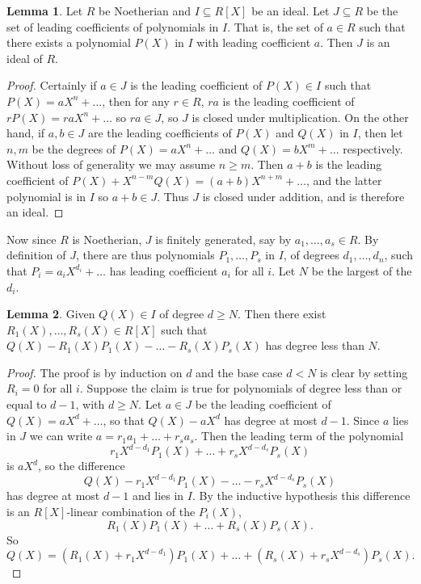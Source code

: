 \documentclass{article}
\newcommand{\rb}[1]{\left( #1 \right)}
\renewcommand{\sb}[1]{\left[ #1 \right]}
\theoremstyle{definition}\newtheorem{definition}{Definition}[subsection]
\theoremstyle{definition}\newtheorem{remark}[definition]{Remark}
\theoremstyle{definition}\newtheorem*{example}{Example}
\theoremstyle{definition}\newtheorem*{note}{Note}
\newtheorem{lemma}[definition]{Lemma}
\begin{document}
\begin{lemma}
Let $ R $ be Noetherian and $ I \subseteq R\sb{X} $ be an ideal. Let $ J \subseteq R $ be the set of leading coefficients of polynomials in $ I $. That is, the set of $ a \in R $ such that there exists a polynomial $ P\rb{X} $ in $ I $ with leading coefficient $ a $. Then $ J $ is an ideal of $ R $.
\end{lemma}

\begin{proof}
Certainly if $ a \in J $ is the leading coefficient of $ P\rb{X} \in I $ such that $ P\rb{X} = aX^n + \dots $, then for any $ r \in R $, $ ra $ is the leading coefficient of $ rP\rb{X} = raX^n + \dots $ so $ ra \in J $, so $ J $ is closed under multiplication. On the other hand, if $ a, b \in J $ are the leading coefficients of $ P\rb{X} $ and $ Q\rb{X} $ in $ I $, then let $ n, m $ be the degrees of $ P\rb{X} = aX^n + \dots $ and $ Q\rb{X} = bX^m + \dots $ respectively. Without loss of generality we may assume $ n \ge m $. Then $ a + b $ is the leading coefficient of $ P\rb{X} + X^{n - m}Q\rb{X} = \rb{a + b}X^{n + m} + \dots $, and the latter polynomial is in $ I $ so $ a + b \in J $. Thus $ J $ is closed under addition, and is therefore an ideal.
\end{proof}

Now since $ R $ is Noetherian, $ J $ is finitely generated, say by $ a_1, \dots, a_s \in R $. By definition of $ J $, there are thus polynomials $ P_1, \dots, P_s $ in $ I $, of degrees $ d_1, \dots, d_n $, such that $ P_i = a_iX^{d_i} + \dots $ has leading coefficient $ a_i $ for all $ i $. Let $ N $ be the largest of the $ d_i $.

\begin{lemma}
Given $ Q\rb{X} \in I $ of degree $ d \ge N $. Then there exist $ R_1\rb{X}, \dots, R_s\rb{X} \in R\sb{X} $ such that $ Q\rb{X} - R_1\rb{X}P_1\rb{X} - \dots - R_s\rb{X}P_s\rb{X} $ has degree less than $ N $.
\end{lemma}

\begin{proof}
The proof is by induction on $ d $ and the base case $ d < N $ is clear by setting $ R_i = 0 $ for all $ i $. Suppose the claim is true for polynomials of degree less than or equal to $ d - 1 $, with $ d \ge N $. Let $ a \in J $ be the leading coefficient of $ Q\rb{X} = aX^d + \dots $, so that $ Q\rb{X} - aX^d $ has degree at most $ d - 1 $. Since $ a $ lies in $ J $ we can write $ a = r_1a_1 + \dots + r_sa_s $. Then the leading term of the polynomial
$$ r_1X^{d - d_1}P_1\rb{X} + \dots + r_sX^{d - d_s}P_s\rb{X} $$
is $ aX^d $, so the difference
$$ Q\rb{X} - r_1X^{d - d_1}P_1\rb{X} - \dots - r_sX^{d - d_s}P_s\rb{X} $$
has degree at most $ d - 1 $ and lies in $ I $. By the inductive hypothesis this difference is an $ R\sb{X} $-linear combination of the $ P_i\rb{X} $,
$$ R_1\rb{X}P_1\rb{X} + \dots + R_s\rb{X}P_s\rb{X}. $$
So
$$ Q\rb{X} = \rb{R_1\rb{X} + r_1X^{d - d_1}}P_1\rb{X} + \dots + \rb{R_s\rb{X} + r_sX^{d - d_s}}P_s\rb{X}. $$
\end{proof}
\end{document}
